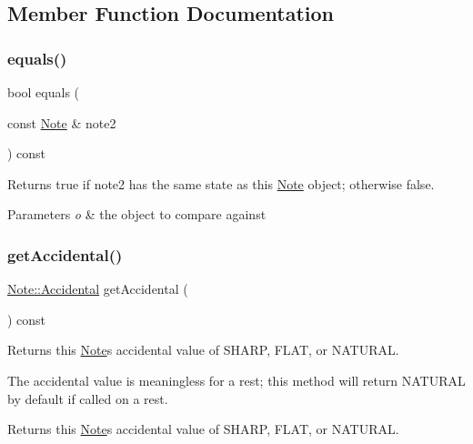 \subsection{Member Function Documentation}
\mbox{\label{classNote_a517a407fe687980159376cf64c5a2775}} 
\subsubsection{\texorpdfstring{equals()}{equals()}}
{\footnotesize\ttfamily bool equals (\begin{DoxyParamCaption}\item[{const \mbox{\hyperlink{classNote}{Note}} \&}]{note2 }\end{DoxyParamCaption}) const}



Returns true if note2 has the same state as this \mbox{\hyperlink{classNote}{Note}} object; otherwise false. 


\begin{DoxyParams}{Parameters}
{\em o} & the object to compare against \\
\hline
\end{DoxyParams}
\mbox{\label{classNote_a5794f20808fe07752a5b88972a5888ff}} 
\subsubsection{\texorpdfstring{get\+Accidental()}{getAccidental()}}
{\footnotesize\ttfamily \mbox{\hyperlink{classNote_a48ac9ae5104f19cec526c22b5323f5d9}{Note\+::\+Accidental}} get\+Accidental (\begin{DoxyParamCaption}{ }\end{DoxyParamCaption}) const}



Returns this \mbox{\hyperlink{classNote}{Note}}\textquotesingle{}s accidental value of S\+H\+A\+RP, F\+L\+AT, or N\+A\+T\+U\+R\+AL. 

The accidental value is meaningless for a rest; this method will return N\+A\+T\+U\+R\+AL by default if called on a rest. \begin{DoxyReturn}{Returns}
this \mbox{\hyperlink{classNote}{Note}}\textquotesingle{}s accidental value of S\+H\+A\+RP, F\+L\+AT, or N\+A\+T\+U\+R\+AL. 
\end{DoxyReturn}
\mbox{\label{classNote_a90398e9c86c5d1b9882f484bd9888dfd}} 
